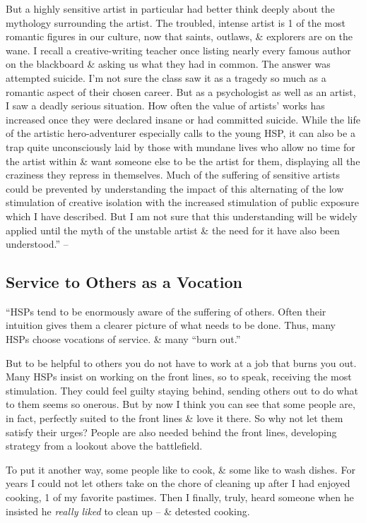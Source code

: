 \documentclass{article}
\numberwithin{equation}{section}
\begin{document}
But a highly sensitive artist in particular had better think deeply about the mythology surrounding the artist. The troubled, intense artist is 1 of the most romantic figures in our culture, now that saints, outlaws, \& explorers are on the wane. I recall a creative-writing teacher once listing nearly every famous author on the blackboard \& asking us what they had in common. The answer was attempted suicide. I'm not sure the class saw it as a tragedy so much as a romantic aspect of their chosen career. But as a psychologist as well as an artist, I saw a deadly serious situation. How often the value of artists' works has increased once they were declared insane or had committed suicide. While the life of the artistic hero-adventurer especially calls to the young HSP, it can also be a trap quite unconsciously laid by those with mundane lives who allow no time for the artist within \& want someone else to be the artist for them, displaying all the craziness they repress in themselves. Much of the suffering of sensitive artists could be prevented by understanding the impact of this alternating of the low stimulation of creative isolation with the increased stimulation of public exposure which I have described. But I am not sure that this understanding will be widely applied until the myth of the unstable artist \& the need for it have also been understood.'' -- \cite[pp. 155--156]{Aron2013}

\subsection{Service to Others as a Vocation}
``HSPs tend to be enormously aware of the suffering of others. Often their intuition gives them a clearer picture of what needs to be done. Thus, many HSPs choose vocations of service. \& many ``burn out.''

But to be helpful to others you do not have to work at a job that burns you out. Many HSPs insist on working on the front lines, so to speak, receiving the most stimulation. They could feel guilty staying behind, sending others out to do what to them seems so onerous. But by now I think you can see that some people are, in fact, perfectly suited to the front lines \& love it there. So why not let them satisfy their urges? People are also needed behind the front lines, developing strategy from a lookout above the battlefield.

To put it another way, some people like to cook, \& some like to wash dishes. For years I could not let others take on the chore of cleaning up after I had enjoyed cooking, 1 of my favorite pastimes. Then I finally, truly, heard someone when he insisted he \textit{really liked} to clean up -- \& detested cooking.
\end{document}
